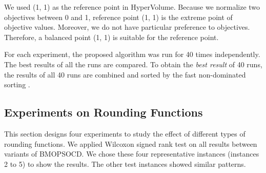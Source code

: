 \documentclass[10pt,journal,compsoc]{IEEEtran}
\begin{document}
We used (1, 1) as the reference point in HyperVolume. Because we normalize two objectives between 0 and 1, reference point (1, 1) is the extreme point of objective values. Moreover, we do not have particular preference to objectives. Therefore, a balanced point (1, 1) is suitable for the reference point.

For each experiment, the proposed algorithm was run for 40 times independently. The best results of all the runs are compared.  To obtain the \emph{best result} of 40 runs, the results of all 40 runs are combined and sorted by the fast non-dominated sorting \cite{nsgaii}.

\begin{table}[]
\centering
{}
\caption{Parameter Settings for BMOPSOCD}
\label{parameter}
\end{table}



\subsection{Experiments on Rounding Functions}\label{sec:expRound}
This section designs four experiments to study the effect of different types of rounding functions. We applied Wilcoxon signed rank test on all results between variants of BMOPSOCD. We chose these four representative instances (instances 2 to 5) to show the results. The other test instances showed similar patterns.

\end{document}

